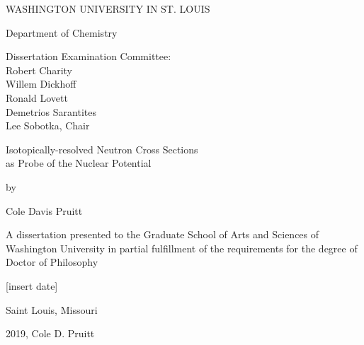 \begin{titlepage}
\begin{singlespace}
  \begin{center}
        \vspace*{1cm}
        
        WASHINGTON UNIVERSITY IN ST. LOUIS
        
        \vspace{0.5cm}
        Department of Chemistry
        
        \vspace{1.5cm}

        Dissertation Examination Committee:\\
        Robert Charity\\
        Willem Dickhoff\\ 
        Ronald Lovett\\
        Demetrios Sarantites\\
        Lee Sobotka, Chair\\
    
        \vspace{1.5 cm}

        Isotopically-resolved Neutron Cross Sections\\
        as Probe of the Nuclear Potential

        \vspace{0.5 cm}

        by

        \vspace{0.5 cm}
        
        Cole Davis Pruitt
        
        \vfill
        
        A dissertation presented to the Graduate School of Arts and Sciences of Washington University in partial fulfillment of the requirements for the degree of Doctor of Philosophy
        
        \vspace{0.8cm}
        
        [insert date]
        
        \vspace{0.5 cm}
        Saint Louis, Missouri
        
      \end{center}
      \end{singlespace}
    \end{titlepage}
    
    \clearpage
    
    \vspace*{\fill}
    \begin{center}    
      \textcopyright \hspace{2pt} 2019, Cole D. Pruitt
    \end{center}
    \vspace*{\fill}
    
    \thispagestyle{empty} %
    \addtocounter{page}{-1}%
    \clearpage
